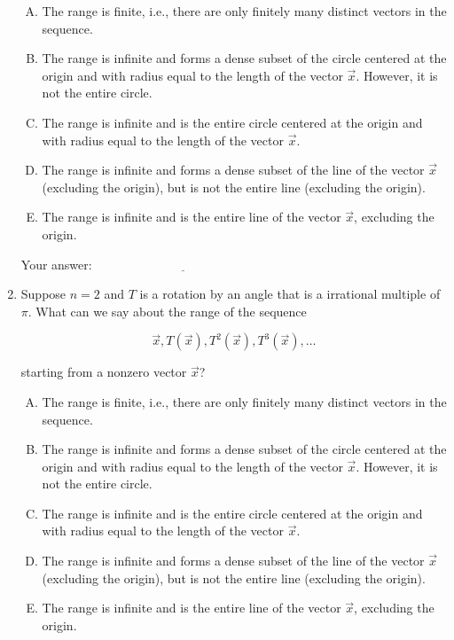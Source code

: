 \documentclass[10pt]{amsart}
\begin{document}
\begin{enumerate}
  \begin{enumerate}[(A)]
  \item The range is finite, i.e., there are only finitely many
    distinct vectors in the sequence.
  \item The range is infinite and forms a dense subset of the circle
    centered at the origin and with radius equal to the length of the
    vector $\vec{x}$. However, it is not the entire circle.
  \item The range is infinite and is the entire circle centered at the
    origin and with radius equal to the length of the vector
    $\vec{x}$.
  \item The range is infinite and forms a dense subset of the line of
    the vector $\vec{x}$ (excluding the origin), but is not the entire
    line (excluding the origin).
  \item The range is infinite and is the entire line of the vector
    $\vec{x}$, excluding the origin.
  \end{enumerate}

  \vspace{0.1in}
  Your answer: $\underline{\qquad\qquad\qquad\qquad\qquad\qquad\qquad}$
  \vspace{0.1in}

\item Suppose $n = 2$ and $T$ is a rotation by an angle that is a
  irrational multiple of $\pi$. What can we say about the range of
  the sequence

  $$\vec{x}, T(\vec{x}), T^2(\vec{x}), T^3(\vec{x}), \dots$$

  starting from a nonzero vector $\vec{x}$?

  \begin{enumerate}[(A)]
  \item The range is finite, i.e., there are only finitely many
    distinct vectors in the sequence.
  \item The range is infinite and forms a dense subset of the circle
    centered at the origin and with radius equal to the length of the
    vector $\vec{x}$. However, it is not the entire circle.
  \item The range is infinite and is the entire circle centered at the
    origin and with radius equal to the length of the vector
    $\vec{x}$.
  \item The range is infinite and forms a dense subset of the line of
    the vector $\vec{x}$ (excluding the origin), but is not the entire
    line (excluding the origin).
  \item The range is infinite and is the entire line of the vector
    $\vec{x}$, excluding the origin.
  \end{enumerate}


\end{enumerate}
\end{document}

